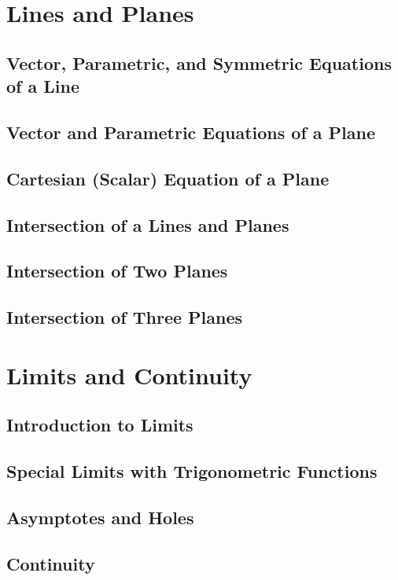 \documentclass[14pt]{article}
\begin{document}
    \section{Lines and Planes}
        \subsection{Vector, Parametric, and Symmetric Equations of a Line}
        \subsection{Vector and Parametric Equations of a Plane}
        \subsection{Cartesian (Scalar) Equation of a Plane}
        \subsection{Intersection of a Lines and Planes}
        \subsection{Intersection of Two Planes}
        \subsection{Intersection of Three Planes}

    \section{Limits and Continuity}
        \subsection{Introduction to Limits}
        \subsection{Special Limits with Trigonometric Functions}
        \subsection{Asymptotes and Holes}
        \subsection{Continuity}
\end{document}
